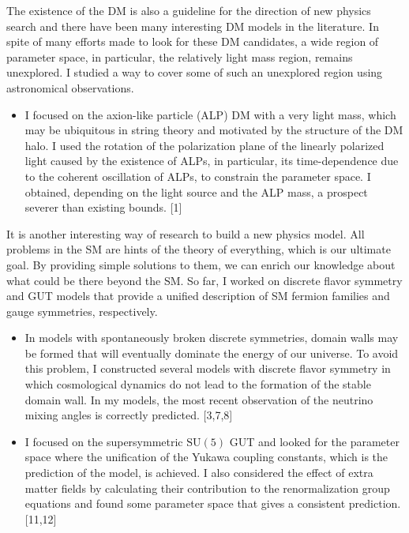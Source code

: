 \documentclass[12pt,notitlepage]{article}
\begin{document}
The existence of the DM is also a guideline for the direction of new physics search and there have been many interesting DM models in the literature.
In spite of many efforts made to look for these DM candidates, a wide region of parameter space, in particular, the relatively light mass region, remains unexplored.
I studied a way to cover some of such an unexplored region using astronomical observations.
\vspace{-1.3mm}
\begin{itemize}
  \setlength{\parskip}{0mm}
  \setlength{\itemsep}{1mm}
  \item
    I focused on the axion-like particle (ALP) DM with a very light mass, which may be ubiquitous in string theory and motivated by the structure of the DM halo.
    I used the rotation of the polarization plane of the linearly polarized light caused by the existence of ALPs, in particular, its time-dependence due to the coherent oscillation of ALPs, to constrain the parameter space.
    I obtained, depending on the light source and the ALP mass, a prospect severer than existing bounds. [1]
\end{itemize}

It is another interesting way of research to build a new physics model.
All problems in the SM are hints of the theory of everything, which is our ultimate goal.
By providing simple solutions to them, we can enrich our knowledge about what could be there beyond the SM.
So far, I worked on discrete flavor symmetry and GUT models that provide a unified description of SM fermion families and gauge symmetries, respectively.
\vspace{-1.3mm}
\begin{itemize}
  \setlength{\parskip}{0mm}
  \setlength{\itemsep}{1mm}
  \item
    In models with spontaneously broken discrete symmetries, domain walls may be formed that will eventually dominate the energy of our universe.
    To avoid this problem, I constructed several models with discrete flavor symmetry in which cosmological dynamics do not lead to the formation of the stable domain wall.
    In my models, the most recent observation of the neutrino mixing angles is correctly predicted. [3,7,8]
  \item
    I focused on the supersymmetric $\mathrm{SU}(5)$ GUT and looked for the parameter space where the unification of the Yukawa coupling constants, which is the prediction of the model, is achieved.
    I also considered the effect of extra matter fields by calculating their contribution to the renormalization group equations and found some parameter space that gives a consistent prediction. [11,12]
\end{itemize}
\end{document}
